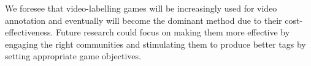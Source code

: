 We foresee that video-labelling games will be increasingly used for video annotation and eventually will become the dominant method due to their cost-effectiveness. Future research could focus on making them more effective by engaging the right communities and stimulating them to produce better tags by setting appropriate game objectives.  






 